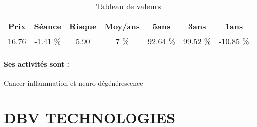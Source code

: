\documentclass[11pt,a4paper]{report}%
\begin{document}
\begin{table}[H]
  \centering
    \begin{tabular}{|c|c|c|c|c|c|c|}
    \hline
    Prix & Séance & Risque  & Moy/ans & 5ans & 3ans & 1ans \\
    \hline
    16.76 &    -1.41 \%    & 5.90 & 7 \% & 92.64 \% & 99.52 \% & -10.85 \% \\
    \hline
    \end{tabular}%
        \label{tab:table_AB SCIENCE}%
      \caption{Tableau de valeurs}
\end{table}%

\paragraph{Ses activités sont : } Cancer inflammation et neuro-dégénérescence 
    
    \newpage

\section{DBV TECHNOLOGIES}
\end{document}
